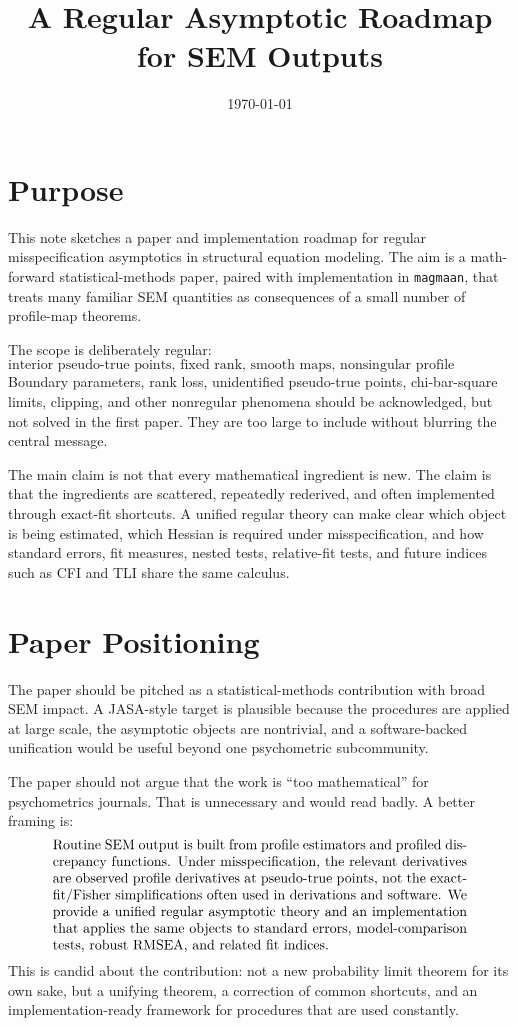 \documentclass[11pt]{article}
\title{A Regular Asymptotic Roadmap for SEM Outputs}
\author{}
\date{\today}
\theoremstyle{plain}
\theoremstyle{remark}
\begin{document}
\maketitle

\section*{Purpose}

This note sketches a paper and implementation roadmap for regular
misspecification asymptotics in structural equation modeling. The aim is a
math-forward statistical-methods paper, paired with implementation in
\texttt{magmaan}, that treats many familiar SEM quantities as consequences of a
small number of profile-map theorems.

The scope is deliberately regular:
\[
  \text{interior pseudo-true points, fixed rank, smooth maps, nonsingular
  profile Hessians.}
\]
Boundary parameters, rank loss, unidentified pseudo-true points, chi-bar-square
limits, clipping, and other nonregular phenomena should be acknowledged, but
not solved in the first paper. They are too large to include without blurring
the central message.

The main claim is not that every mathematical ingredient is new. The claim is
that the ingredients are scattered, repeatedly rederived, and often
implemented through exact-fit shortcuts. A unified regular theory can make clear
which object is being estimated, which Hessian is required under
misspecification, and how standard errors, fit measures, nested tests,
relative-fit tests, and future indices such as CFI and TLI share the same
calculus.

\section{Paper Positioning}

The paper should be pitched as a statistical-methods contribution with broad SEM
impact. A JASA-style target is plausible because the procedures are applied at
large scale, the asymptotic objects are nontrivial, and a software-backed
unification would be useful beyond one psychometric subcommunity.

The paper should not argue that the work is ``too mathematical'' for
psychometrics journals. That is unnecessary and would read badly. A better
framing is:
\[
\begin{minipage}{0.86\linewidth}
Routine SEM output is built from profile estimators and profiled discrepancy
functions. Under misspecification, the relevant derivatives are observed
profile derivatives at pseudo-true points, not the exact-fit/Fisher
simplifications often used in derivations and software. We provide a unified
regular asymptotic theory and an implementation that applies the same objects to
standard errors, model-comparison tests, robust RMSEA, and related fit indices.
\end{minipage}
\]
This is candid about the contribution: not a new probability limit theorem for
its own sake, but a unifying theorem, a correction of common shortcuts, and an
implementation-ready framework for procedures that are used constantly.
\end{document}
